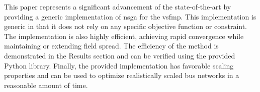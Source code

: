 This paper represents a significant advancement of the state-of-the-art by providing a generic implementation of \gls{nsga} for the \gls{vsfmp}. This implementation is generic in that it does not rely on any specific objective function or constraint. The implementation is also highly efficient, achieving rapid convergence while maintaining or extending field spread. The efficiency of the method is demonstrated in the Results section and can be verified using the provided Python library. Finally, the provided implementation has favorable scaling properties and can be used to optimize realistically scaled bus networks in a reasonable amount of time.